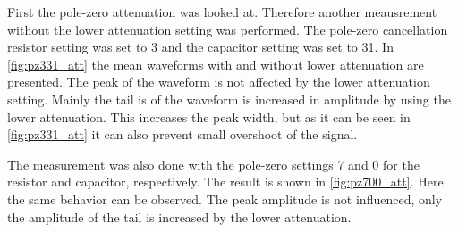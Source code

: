 First the pole-zero attenuation was looked at.
Therefore another meausrement without the lower attenuation setting was performed.
The pole-zero cancellation resistor setting was set to 3 and the capacitor setting was set to 31. 
In \autoref{fig:pz331_att} the mean waveforms with and without lower attenuation are presented.
The peak of the waveform is not affected by the lower attenuation setting.
Mainly the tail is of the waveform is increased in amplitude by using the lower attenuation.
This increases the peak width, but as it can be seen in \autoref{fig:pz331_att} it can also prevent small overshoot of the signal.

The measurement was also done with the pole-zero settings 7 and 0 for the resistor and capacitor, respectively.
The result is shown in \autoref{fig:pz700_att}.
Here the same behavior can be observed.
The peak amplitude is not influenced, only the amplitude of the tail is increased by the lower attenuation.
